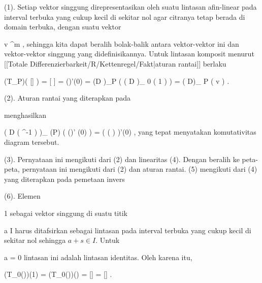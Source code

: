 {

\teilbeweis {}{}{}
{(1). Setiap vektor singgung direpresentasikan oleh suatu lintasan afin-linear pada interval terbuka yang cukup kecil di sekitar nol agar citranya tetap berada di domain terbuka,
dengan suatu vektor

\mavergleichskette
{\vergleichskette
{v
}
{ \in }{\R^m
}
{  }{
}
{    }{
}
{   }{
}
}
{}{}{,}
sehingga kita dapat beralih bolak-balik antara vektor-vektor ini dan vektor-vektor singgung yang didefinisikannya. Untuk lintasan komposit
\mathl{\varphi \circ \gamma}{}
menurut
[[Totale Differenzierbarkeit/R/Kettenregel/Fakt|aturan rantai]]
berlaku

\mavergleichskettedisp
{\vergleichskette
{ (T_P\varphi )( [\gamma ] )
}
{ =} { [ \varphi \circ \gamma ]
}
{ =} { (\varphi \circ \gamma)'(0)
}
{ =} { (D \varphi)_P \left( \left(  D \gamma  \right)_{ 0 } \left(   1  \right) \right)
}
{ =} { \left(  D\varphi  \right)_{ P } \left(  v  \right)
}
}
{}{}{.}}
{}
\teilbeweis {}{}{}
{(2). Aturan rantai yang diterapkan pada
 {} {}

 {  }

menghasilkan

\mavergleichskettedisp
{\vergleichskette
{ \left(  D   \left(   \beta \circ \varphi \circ \alpha^{-1}    \right)      \right)_{ \alpha(P)} \left(   (\alpha \circ \gamma)' (0)    \right)
}
{ =} { ( \beta \circ ( \varphi \circ \gamma) )'(0)
}
{ } {
}
{ } {
}
{ } {
}
}
{}{}{,}
yang tepat menyatakan komutativitas diagram tersebut.}
{}
\teilbeweis {}{}{}
{(3). Pernyataan ini mengikuti dari (2) dan linearitas
}
{}
\teilbeweis {}{}{}
{(4). Dengan beralih ke peta-peta, pernyataan ini mengikuti dari (2) dan aturan rantai.}
{}
\teilbeweis {}{}{}
{(5) mengikuti dari (4) yang diterapkan pada pemetaan invers
}
{}
\teilbeweis {}{}{}
{(6). Elemen

\mavergleichskette
{\vergleichskette
{ 1
}
{ \in }{\R
}
{  }{
}
{    }{
}
{   }{
}
}
{}{}{}
sebagai vektor singgung di suatu titik

\mavergleichskette
{\vergleichskette
{a
}
{ \in }{ I
}
{  }{
}
{    }{
}
{   }{
}
}
{}{}{}
harus ditafsirkan sebagai lintasan
pada interval terbuka yang cukup kecil di sekitar nol sehingga $a+s\in I$.
Untuk

\mavergleichskette
{\vergleichskette
{a
}
{ = }{ 0
}
{  }{
}
{    }{
}
{   }{
}
}
{}{}{}
lintasan ini adalah lintasan identitas. Oleh karena itu,

\mavergleichskettedisp
{\vergleichskette
{ (T_0(\gamma))(1)
}
{ =} { (T_0(\gamma))()
}
{ =} { [\gamma \circ {}]
}
{ =} { [\gamma ]
}
{ } {
}
}
{}{}{.}}
{}

}

